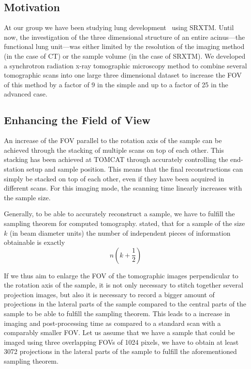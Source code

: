 \subsection{Motivation}
At our group we have been studying lung development~\cite{Schittny2008}  using SRXTM. Until now, the investigation of the three dimensional structure of an entire acinus---the functional lung unit---was either limited by the resolution of the imaging method (in the case of \micro CT) or the sample volume (in the case of SRXTM). We developed a synchrotron radiation x-ray tomographic microscopy method to combine several tomographic scans into one large three dimensional dataset to increase the FOV of this method by a factor of 9 in the simple and up to a factor of 25 in the advanced case.

\subsection{Enhancing the Field of View}
\label{subsec:enhancing the field of view}
An increase of the FOV parallel to the rotation axis of the sample can be achieved through the stacking of multiple scans on top of each other. This stacking has been achieved at TOMCAT through accurately controlling the end-station setup and sample position.
This means that the final reconstructions can simply be stacked on top of each other, even if they have been acquired in different scans. For this imaging mode, the scanning time linearly increases with the sample size.

Generally, to be able to accurately reconstruct a sample, we have to fulfill the sampling theorem for computed tomography. \citet{Cormack1978} stated, that for a sample of the size $k$ (in beam diameter units) the number of independent pieces of information obtainable is exactly 
\begin{equation}
n(k+\frac{1}{2})%
\end{equation}

If we thus aim to enlarge the FOV of the tomographic images perpendicular to the rotation axis of the sample, it is not only necessary to stitch together several projection images, but also it is necessary to record a bigger amount of projections in the lateral parts of the sample compared to the central parts of the sample to be able to fulfill the sampling theorem. This leads to a increase in imaging and post-processing time as compared to a standard scan with a comparably smaller FOV. Let us assume that we have a sample that could be imaged using three overlapping FOVs of 1024 pixels, we have to obtain at least 3072 projections in the lateral parts of the sample to fulfill the aforementioned sampling theorem. 


